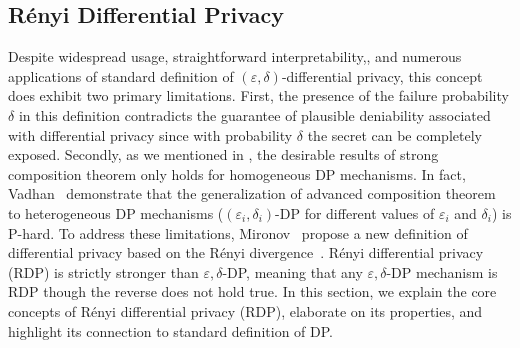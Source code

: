 \subsection{R\'enyi Differential Privacy}
Despite widespread usage, straightforward interpretability,, and numerous applications of standard definition of $(\varepsilon, \delta)$-differential privacy, this concept does exhibit two primary limitations. 
First, the presence of the failure probability $\delta$ in this definition contradicts the guarantee of  plausible deniability associated with differential privacy since with probability $\delta$ the secret can be completely exposed.    
Secondly, as we mentioned in , the desirable results of strong composition theorem only holds for homogeneous DP mechanisms.
In fact, Vadhan~ demonstrate that the generalization of advanced composition theorem to heterogeneous DP mechanisms (\ie $(\varepsilon_i, \delta_i)$-DP for different values of $\varepsilon_i$ and $\delta_i$) is P-hard.
To address these limitations, Mironov~ propose a new definition of differential privacy based on the R\'enyi divergence~\cite{renyi1961measures}.
R\'enyi differential privacy (RDP) is strictly stronger than $\varepsilon, \delta$-DP, meaning that any $\varepsilon, \delta$-DP mechanism is RDP though the reverse does not hold true.
In this section, we explain the core concepts of R\'enyi differential privacy (RDP), elaborate on its properties, and highlight its connection to standard definition of DP.

